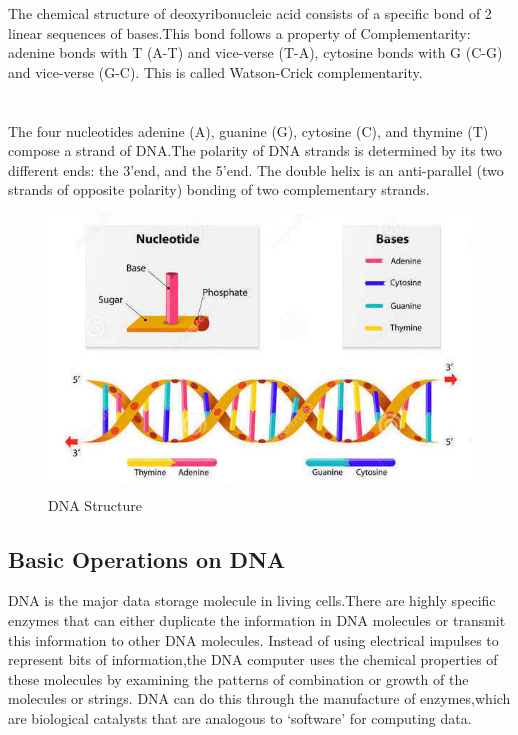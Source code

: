 \documentclass[a4paper]{article}
\begin{document}
The chemical structure of deoxyribonucleic acid consists of a specific bond of 2 linear sequences of bases.This bond follows a property of Complementarity: adenine bonds with T (A-T) and vice-verse (T-A), cytosine bonds with G (C-G) and vice-verse (G-C). This is called Watson-Crick complementarity.
\\ \\ \\ 

The four nucleotides adenine (A), guanine (G), cytosine (C), and thymine (T) compose a strand of DNA.The polarity of DNA strands is determined by its two different ends: the 3’end, and the 5’end. The double helix is an anti-parallel (two strands of opposite polarity) bonding of two complementary strands.

\begin{figure}[h!]
  \centering
  \includegraphics[width=\textwidth]{dna}
  \caption{DNA Structure}
\end{figure}
 
\subsection{Basic Operations on DNA}
DNA is the major data storage molecule in living cells.There are highly  specific  enzymes  that  can  either duplicate the information in DNA molecules or transmit this information to other DNA molecules. Instead of using electrical impulses to represent bits of  information,the  DNA  computer  uses  the  chemical  properties  of these  molecules by  examining  the  patterns  of  combination  or  growth  of the  molecules or  strings.  DNA  can  do  this  through  the  manufacture  of enzymes,which   are   biological   catalysts that are analogous to `software' for computing data.
\end{document}
